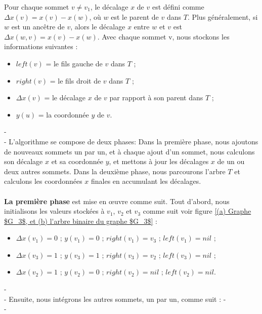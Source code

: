\documentclass[hidelinks,letterpaper,12pt]{article}
\begin{document}
Pour chaque sommet \(v \neq v_1\), le décalage $x$ de $v$ est défini comme $\Delta x(v) = x(v) - x(w)$, où $w$ est le parent de $v$ dans $T$. Plus généralement, si $w$ est un ancêtre de $v$, alors le décalage $x$ entre $w$ et $v$ est \(\Delta x(w,v) = x(v) - x(w)\).
Avec chaque sommet v, nous stockons les informations suivantes : 
\begin{itemize}
\item $left(v)$ = le fils gauche de $v$ dans $T$ ; 
\item $right(v)$ = le fils droit de $v$ dans $T$ ; 
\item $\Delta x(v)$ = le décalage $x$ de $v$ par rapport à son parent dans $T$ ; 
\item $y(u)$ = la coordonnée $y$ de $v$.
\end{itemize}
{\color{white}-}
\\
{\color{white}-}
L'algorithme se compose de deux phases: Dans la première phase, nous ajoutons de nouveaux sommets un par un, et à chaque ajout d'un sommet, nous calculons son décalage $x$ et sa coordonnée $y$, et mettons à jour les décalages $x$ de un ou deux autres sommets. 
Dans la deuxième phase, nous parcourons l'arbre $T$ et calculons les coordonnées $x$ finales en accumulant les décalages.
\\ \\
\textbf{La première phase} est mise en œuvre comme suit. Tout d'abord, nous initialisons les valeurs stockées à $v_1$, $v_2$ et $v_3$ comme suit voir figure \ref{(a) Graphe $G_3$, et (b) l'arbre binaire du graphe $G_3$} :
\begin{itemize}
\item $\Delta x(v_1) = 0$ ; $y(v_1) = 0$ ; $right(v_1) = v_3$ ; $left(v_1) = nil$ ; 
\item $\Delta x(v_3) = 1$ ; $y(v_3) = 1$ ; $right(v_3) = v_2$ ; $left(v_3) = nil$ ; 
\item $\Delta x(v_2) = 1$ ; $y(v_2) = 0$ ; $right(v_2) = nil$ ; $left(v_2) = nil$. 
\end{itemize}
{\color{white}-}
\\
{\color{white}-}
Ensuite, nous intégrons les autres sommets, un par un, comme suit :
{\color{white}-}
\\
{\color{white}-}
\end{document}
